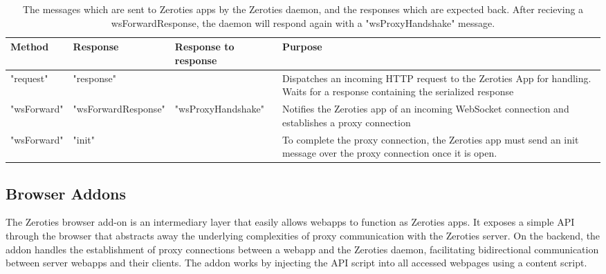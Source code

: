 \begin{table*}[h]
    \small
    \centering
\begin{tabularx}{\textwidth}{|l|l|l|l|}
    \hline
Method      & Response            & Response to response & Purpose                                                                                                                       \\
\hline
"request"   & "response"          &                      & Dispatches an incoming HTTP request to the Zeroties App for handling. Waits for a response containing the serialized response \\
"wsForward" & "wsForwardResponse" & "wsProxyHandshake"   & Notifies the Zeroties app of an incoming WebSocket connection and establishes a proxy connection                              \\
"wsForward" & "init"              &                      & To complete the proxy connection, the Zeroties app must send an init message over the proxy connection once it is open.      \\
\hline
\end{tabularx}
\caption{The messages which are sent to Zeroties apps by the Zeroties daemon, and the responses which are expected back. After recieving a wsForwardResponse, the daemon will respond again with a "wsProxyHandshake" message.}
\label{tab:zerotiesProtocol}
\end{table*}

\subsection{Browser Addons}
\label{sub:browser_addons}

The Zeroties browser add-on is an intermediary layer that easily allows webapps to function as Zeroties apps.
It exposes a simple API through the browser that abstracts away the underlying complexities of proxy communication with the Zeroties server.
On the backend, the addon handles the establishment of proxy connections between a webapp and the Zeroties daemon, facilitating bidirectional communication between server webapps and their clients.
The addon works by injecting the API script into all accessed webpages using a content script.

